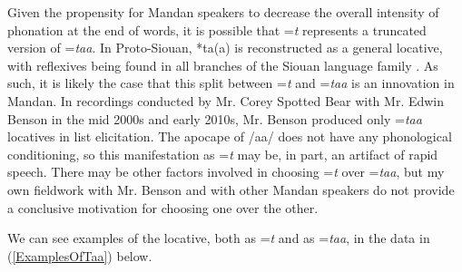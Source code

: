 Given the propensity for Mandan speakers to decrease the overall intensity of phonation at the end of words, it is possible that =\textit{t} represents a truncated version of =\textit{taa}. In Proto-Siouan, *ta(a) is reconstructed as a general locative, with reflexives being found in all branches of the Siouan language family \citep{rankin2015}. As such, it is likely the case that this split between =\textit{t} and =\textit{taa} is an innovation in Mandan. In recordings conducted by Mr. Corey Spotted Bear with Mr. Edwin Benson in the mid 2000s and early 2010s, Mr. Benson produced only =\textit{taa} locatives in list elicitation. The apocape of /aa/ does not have any phonological conditioning, so this manifestation as =\textit{t} may be, in part, an artifact of rapid speech. There may be other factors involved in choosing =\textit{t} over =\textit{taa}, but my own fieldwork with Mr. Benson and with other Mandan speakers do not provide a conclusive motivation for choosing one over the other.

We can see examples of the locative, both as =\textit{t} and as =\textit{taa}, in the data in (\ref{ExamplesOfTaa}) below.

